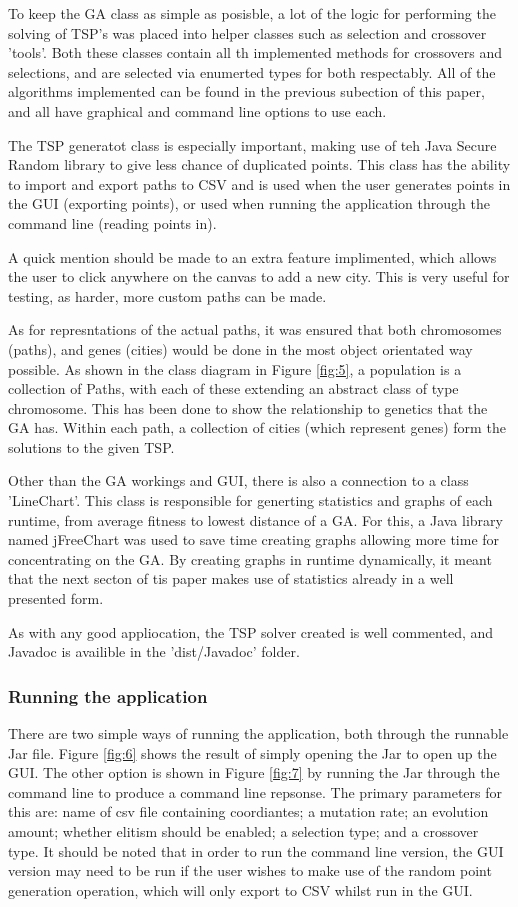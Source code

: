 \documentclass[article]{IEEEtran}
\begin{document}
To keep the GA class as simple as posisble, a lot of the logic for performing the solving of TSP's was placed into helper classes such as selection and crossover 'tools'. Both these classes contain all th implemented methods for crossovers and selections, and are selected via enumerted types for both respectably. All of the algorithms implemented can be found in the previous subection of this paper, and all have graphical and command line options to use each. \par
The TSP generatot class is especially important, making use of teh Java Secure Random library to give less chance of duplicated points. This class has the ability to import and export paths to CSV and is used when the user generates points in the GUI (exporting points), or used when running the application through the command line (reading points in).\par
A quick mention should be made to an extra feature implimented, which allows the user to click anywhere on the canvas to add a new city. This is very useful for testing, as harder, more custom paths can be made. \par
As for represntations of the actual paths, it was ensured that both chromosomes (paths), and genes (cities) would be done in the most object orientated way possible. As shown in the class diagram in Figure \ref{fig:5}, a population is a collection of Paths, with each of these extending an abstract class of type chromosome. This has been done to show the relationship to genetics that the GA has. Within each path, a collection of cities (which represent genes) form the solutions to the given TSP. \par
Other than the GA workings and GUI, there is also a connection to a class 'LineChart'. This class is responsible for generting statistics and graphs of each runtime, from average fitness to lowest distance of a GA. For this, a Java library named jFreeChart \cite{10} was used to save time creating graphs allowing more time for concentrating on the GA. By creating graphs in runtime dynamically, it meant that the next secton of tis paper makes use of statistics already in a well presented form.\par
As with any good appliocation, the TSP solver created is well commented, and Javadoc is availible in the 'dist/Javadoc' folder.

\subsubsection{Running the application}
There are two simple ways of running the application, both through the runnable Jar file. Figure \ref{fig:6} shows the result of simply opening the Jar to open up the GUI. The other option is shown in Figure \ref{fig:7} by running the Jar through the command line to produce a command line repsonse. The primary parameters for this are: name of csv file containing coordiantes; a mutation rate; an evolution amount; whether elitism should be enabled; a selection type; and a crossover type. It should be noted that in order to run the command line version, the GUI version may need to be run if the user wishes to make use of the random point generation operation, which will only export to CSV whilst run in the GUI.
\end{document}
